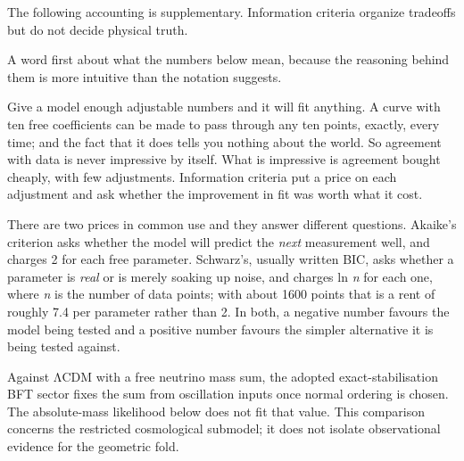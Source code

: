 \documentclass[
]{article}
\begin{document}
The following accounting is supplementary. Information criteria organize
tradeoffs but do not decide physical truth.

A word first about what the numbers below mean, because the reasoning
behind them is more intuitive than the notation suggests.

Give a model enough adjustable numbers and it will fit anything. A curve
with ten free coefficients can be made to pass through any ten points,
exactly, every time; and the fact that it does tells you nothing about
the world. So agreement with data is never impressive by itself. What is
impressive is agreement bought cheaply, with few adjustments.
Information criteria put a price on each adjustment and ask whether the
improvement in fit was worth what it cost.

There are two prices in common use and they answer different questions.
Akaike's criterion asks whether the model will predict the \emph{next}
measurement well, and charges 2 for each free parameter. Schwarz's,
usually written BIC, asks whether a parameter is \emph{real} or is
merely soaking up noise, and charges ln \emph{n} for each one, where
\emph{n} is the number of data points; with about 1600 points that is a
rent of roughly 7.4 per parameter rather than 2. In both, a negative
number favours the model being tested and a positive number favours the
simpler alternative it is being tested against.

Against ΛCDM with a free neutrino mass sum, the adopted
exact-stabilisation BFT sector fixes the sum from oscillation inputs
once normal ordering is chosen. The absolute-mass likelihood below does
not fit that value. This comparison concerns the restricted cosmological
submodel; it does not isolate observational evidence for the geometric
fold.
\end{document}
